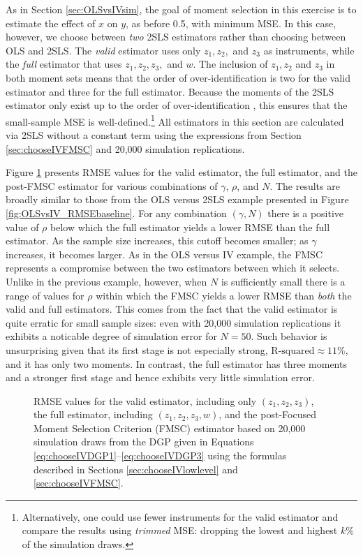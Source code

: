 As in Section \ref{sec:OLSvsIVsim}, the goal of moment selection in this exercise is to estimate the effect of $x$ on $y$, as before 0.5, with minimum MSE.
In this case, however, we choose between \emph{two} 2SLS estimators rather than choosing between OLS and 2SLS.
The \emph{valid} estimator uses only $z_1, z_2,$ and $z_3$ as instruments, while the \emph{full} estimator that uses $z_1, z_2, z_3,$ and $w$. 
The inclusion of $z_1, z_2$ and $z_3$ in both moment sets means that the order of over-identification is two for the valid estimator and three for the full estimator. 
Because the moments of the 2SLS estimator only exist up to the order of over-identification \citep{Phillips1980}, this ensures that the small-sample MSE is well-defined.\footnote{Alternatively, one could use fewer instruments for the valid estimator and compare the results using \emph{trimmed} MSE: dropping the lowest and highest $k\%$ of the simulation draws.}
All estimators in this section are calculated via 2SLS without a constant term using the expressions from Section \ref{sec:chooseIVFMSC} and 20,000 simulation replications.
 
Figure \ref{fig:chooseIVsim_RMSEbaseline} presents RMSE values for the valid estimator, the full estimator, and the post-FMSC estimator for various combinations of $\gamma$, $\rho$, and $N$.
The results are broadly similar to those from the OLS versus 2SLS example presented in Figure \ref{fig:OLSvsIV_RMSEbaseline}.
For any combination $(\gamma,N)$ there is a positive value of $\rho$ below which the full estimator yields a lower RMSE than the full estimator.
As the sample size increases, this cutoff becomes smaller; as $\gamma$ increases, it becomes larger.
As in the OLS versus IV example, the FMSC represents a compromise between the two estimators between which it selects.
Unlike in the previous example, however, when $N$ is sufficiently small there is a range of values for $\rho$ within which the FMSC yields a lower RMSE than \emph{both} the valid and full estimators.
This comes from the fact that the valid estimator is quite erratic for small sample sizes: even with 20,000 simulation replications it exhibits a noticable degree of simulation error for $N=50$.
Such behavior is unsurprising given that its first stage is not especially strong, $\mbox{R-squared}\approx 11\%$, and it has only two moments.
In contrast, the full estimator has three moments and a stronger first stage and hence exhibits very little simulation error.
\begin{figure}
\centering
	
	\caption{RMSE values for the valid estimator, including only $(z_1, z_2, z_3)$, the full estimator, including $(z_1, z_2, z_3, w)$, and the post-Focused Moment Selection Criterion (FMSC) estimator based on 20,000 simulation draws from the DGP given in Equations \ref{eq:chooseIVDGP1}--\ref{eq:chooseIVDGP3} using the formulas described in Sections \ref{sec:chooseIVlowlevel} and \ref{sec:chooseIVFMSC}.}
	\label{fig:chooseIVsim_RMSEbaseline}
\end{figure}

